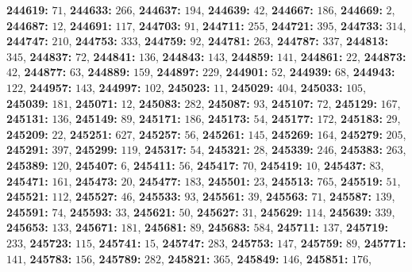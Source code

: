 \textsf{\bfseries 244619:} $71$, \textsf{\bfseries 244633:} $266$, \textsf{\bfseries 244637:} $194$, \textsf{\bfseries 244639:} $42$, \textsf{\bfseries 244667:} $186$, \textsf{\bfseries 244669:} $2$, \textsf{\bfseries 244687:} $12$, \textsf{\bfseries 244691:} $117$, \textsf{\bfseries 244703:} $91$, \textsf{\bfseries 244711:} $255$, \textsf{\bfseries 244721:} $395$, \textsf{\bfseries 244733:} $314$, \textsf{\bfseries 244747:} $210$, \textsf{\bfseries 244753:} $333$, \textsf{\bfseries 244759:} $92$, \textsf{\bfseries 244781:} $263$, \textsf{\bfseries 244787:} $337$, \textsf{\bfseries 244813:} $345$, \textsf{\bfseries 244837:} $72$, \textsf{\bfseries 244841:} $136$, \textsf{\bfseries 244843:} $143$, \textsf{\bfseries 244859:} $141$, \textsf{\bfseries 244861:} $22$, \textsf{\bfseries 244873:} $42$, \textsf{\bfseries 244877:} $63$, \textsf{\bfseries 244889:} $159$, \textsf{\bfseries 244897:} $229$, \textsf{\bfseries 244901:} $52$, \textsf{\bfseries 244939:} $68$, \textsf{\bfseries 244943:} $122$, \textsf{\bfseries 244957:} $143$, \textsf{\bfseries 244997:} $102$, \textsf{\bfseries 245023:} $11$, \textsf{\bfseries 245029:} $404$, \textsf{\bfseries 245033:} $105$, \textsf{\bfseries 245039:} $181$, \textsf{\bfseries 245071:} $12$, \textsf{\bfseries 245083:} $282$, \textsf{\bfseries 245087:} $93$, \textsf{\bfseries 245107:} $72$, \textsf{\bfseries 245129:} $167$, \textsf{\bfseries 245131:} $136$, \textsf{\bfseries 245149:} $89$, \textsf{\bfseries 245171:} $186$, \textsf{\bfseries 245173:} $54$, \textsf{\bfseries 245177:} $172$, \textsf{\bfseries 245183:} $29$, \textsf{\bfseries 245209:} $22$, \textsf{\bfseries 245251:} $627$, \textsf{\bfseries 245257:} $56$, \textsf{\bfseries 245261:} $145$, \textsf{\bfseries 245269:} $164$, \textsf{\bfseries 245279:} $205$, \textsf{\bfseries 245291:} $397$, \textsf{\bfseries 245299:} $119$, \textsf{\bfseries 245317:} $54$, \textsf{\bfseries 245321:} $28$, \textsf{\bfseries 245339:} $246$, \textsf{\bfseries 245383:} $263$, \textsf{\bfseries 245389:} $120$, \textsf{\bfseries 245407:} $6$, \textsf{\bfseries 245411:} $56$, \textsf{\bfseries 245417:} $70$, \textsf{\bfseries 245419:} $10$, \textsf{\bfseries 245437:} $83$, \textsf{\bfseries 245471:} $161$, \textsf{\bfseries 245473:} $20$, \textsf{\bfseries 245477:} $183$, \textsf{\bfseries 245501:} $23$, \textsf{\bfseries 245513:} $765$, \textsf{\bfseries 245519:} $51$, \textsf{\bfseries 245521:} $112$, \textsf{\bfseries 245527:} $46$, \textsf{\bfseries 245533:} $93$, \textsf{\bfseries 245561:} $39$, \textsf{\bfseries 245563:} $71$, \textsf{\bfseries 245587:} $139$, \textsf{\bfseries 245591:} $74$, \textsf{\bfseries 245593:} $33$, \textsf{\bfseries 245621:} $50$, \textsf{\bfseries 245627:} $31$, \textsf{\bfseries 245629:} $114$, \textsf{\bfseries 245639:} $339$, \textsf{\bfseries 245653:} $133$, \textsf{\bfseries 245671:} $181$, \textsf{\bfseries 245681:} $89$, \textsf{\bfseries 245683:} $584$, \textsf{\bfseries 245711:} $137$, \textsf{\bfseries 245719:} $233$, \textsf{\bfseries 245723:} $115$, \textsf{\bfseries 245741:} $15$, \textsf{\bfseries 245747:} $283$, \textsf{\bfseries 245753:} $147$, \textsf{\bfseries 245759:} $89$, \textsf{\bfseries 245771:} $141$, \textsf{\bfseries 245783:} $156$, \textsf{\bfseries 245789:} $282$, \textsf{\bfseries 245821:} $365$, \textsf{\bfseries 245849:} $146$, \textsf{\bfseries 245851:} $176$, 

